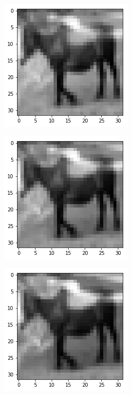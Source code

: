 \begin{figure}[H]
\bigskip
\begin{subfigure}{.3\linewidth}
 \centering
 \includegraphics[scale=0.4]{chapter_3_figures/interp5.png}
\end{subfigure}
 \hfill
\begin{subfigure}{.3\linewidth}
 \centering
 \includegraphics[scale=0.4]{chapter_3_figures/interp6.png}
\end{subfigure}
 \hfill
\begin{subfigure}{.3\linewidth}
 \centering
 \includegraphics[scale=0.4]{chapter_3_figures/interp7.png}

\end{subfigure}
\end{figure}
